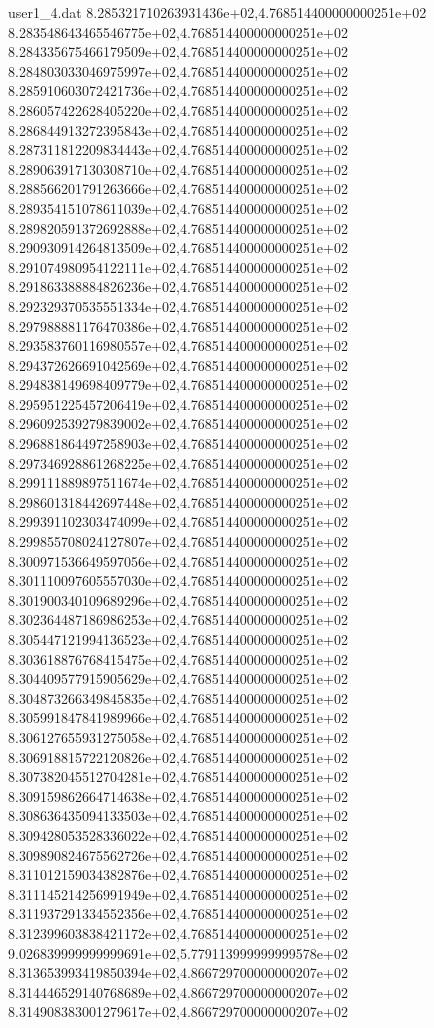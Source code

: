 \begin{filecontents}{user1_4.dat}
8.285321710263931436e+02,4.768514400000000251e+02
8.283548643465546775e+02,4.768514400000000251e+02
8.284335675466179509e+02,4.768514400000000251e+02
8.284803033046975997e+02,4.768514400000000251e+02
8.285910603072421736e+02,4.768514400000000251e+02
8.286057422628405220e+02,4.768514400000000251e+02
8.286844913272395843e+02,4.768514400000000251e+02
8.287311812209834443e+02,4.768514400000000251e+02
8.289063917130308710e+02,4.768514400000000251e+02
8.288566201791263666e+02,4.768514400000000251e+02
8.289354151078611039e+02,4.768514400000000251e+02
8.289820591372692888e+02,4.768514400000000251e+02
8.290930914264813509e+02,4.768514400000000251e+02
8.291074980954122111e+02,4.768514400000000251e+02
8.291863388884826236e+02,4.768514400000000251e+02
8.292329370535551334e+02,4.768514400000000251e+02
8.297988881176470386e+02,4.768514400000000251e+02
8.293583760116980557e+02,4.768514400000000251e+02
8.294372626691042569e+02,4.768514400000000251e+02
8.294838149698409779e+02,4.768514400000000251e+02
8.295951225457206419e+02,4.768514400000000251e+02
8.296092539279839002e+02,4.768514400000000251e+02
8.296881864497258903e+02,4.768514400000000251e+02
8.297346928861268225e+02,4.768514400000000251e+02
8.299111889897511674e+02,4.768514400000000251e+02
8.298601318442697448e+02,4.768514400000000251e+02
8.299391102303474099e+02,4.768514400000000251e+02
8.299855708024127807e+02,4.768514400000000251e+02
8.300971536649597056e+02,4.768514400000000251e+02
8.301110097605557030e+02,4.768514400000000251e+02
8.301900340109689296e+02,4.768514400000000251e+02
8.302364487186986253e+02,4.768514400000000251e+02
8.305447121994136523e+02,4.768514400000000251e+02
8.303618876768415475e+02,4.768514400000000251e+02
8.304409577915905629e+02,4.768514400000000251e+02
8.304873266349845835e+02,4.768514400000000251e+02
8.305991847841989966e+02,4.768514400000000251e+02
8.306127655931275058e+02,4.768514400000000251e+02
8.306918815722120826e+02,4.768514400000000251e+02
8.307382045512704281e+02,4.768514400000000251e+02
8.309159862664714638e+02,4.768514400000000251e+02
8.308636435094133503e+02,4.768514400000000251e+02
8.309428053528336022e+02,4.768514400000000251e+02
8.309890824675562726e+02,4.768514400000000251e+02
8.311012159034382876e+02,4.768514400000000251e+02
8.311145214256991949e+02,4.768514400000000251e+02
8.311937291334552356e+02,4.768514400000000251e+02
8.312399603838421172e+02,4.768514400000000251e+02
9.026839999999999691e+02,5.779113999999999578e+02
8.313653993419850394e+02,4.866729700000000207e+02
8.314446529140768689e+02,4.866729700000000207e+02
8.314908383001279617e+02,4.866729700000000207e+02

\end{filecontents}
